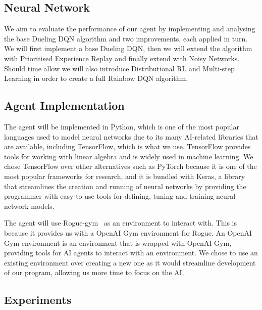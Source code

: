 \documentclass[12pt,a4paper]{article}
\begin{document}
    \subsection{Neural Network}\label{subsec:neural-network}
    We aim to evaluate the performance of our agent by implementing and analysing the base Dueling DQN algorithm and two improvements, each applied in turn.
    We will first implement a base Dueling DQN, then we will extend the algorithm with Prioritised Experience Replay and finally extend with Noisy Networks.
    Should time allow we will also introduce Distributional RL and Multi-step Learning in order to create a full Rainbow DQN algorithm.


    \subsection{Agent Implementation}\label{subsec:implementation}
    The agent will be implemented in Python, which is one of the most popular languages used to model neural networks due to its many AI-related libraries that are available, including TensorFlow, which is what we use.
    TensorFlow provides tools for working with linear algebra and is widely used in machine learning.
    We chose TensorFlow over other alternatives such as PyTorch because it is one of the most popular frameworks for research,
    and it is bundled with Keras, a library that streamlines the creation and running of neural networks by providing the programmer with
    easy-to-use tools for defining, tuning and training neural network models.

    The agent will use Rogue-gym~\citep{kanagawa19} as an environment to interact with.
    This is because it provides us with a OpenAI Gym environment for Rogue.
    An OpenAI Gym environment is an environment that is wrapped with OpenAI Gym, providing tools for AI agents to interact with an environment.
    We chose to use an existing environment over creating a new one as it would streamline development of our program, allowing us more time to focus on the AI.
    
    \subsection{Experiments}\label{subsec:experiments} %
\end{document}
